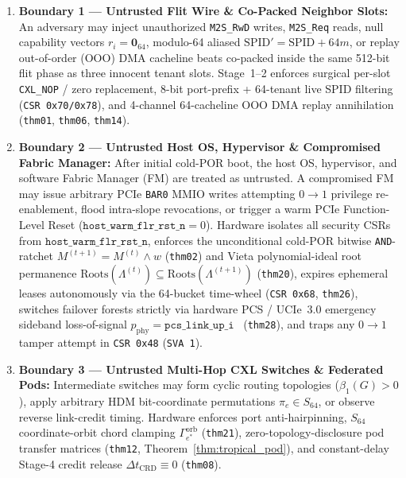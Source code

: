 \documentclass[10pt,twocolumn]{article}
\theoremstyle{spectralthm}
\begin{document}
\begin{enumerate}
  \item \textbf{Boundary 1 --- Untrusted Flit Wire \& Co-Packed Neighbor Slots:} An adversary may inject unauthorized \texttt{M2S\_RwD} writes, \texttt{M2S\_Req} reads, null capability vectors $r_i = \mathbf{0}_{64}$, modulo-64 aliased $\mathrm{SPID}' = \mathrm{SPID} + 64m$, or replay out-of-order (OOO) DMA cacheline beats co-packed inside the same 512-bit flit phase as three innocent tenant slots. Stage~1--2 enforces surgical per-slot \texttt{CXL\_NOP} / zero replacement, 8-bit port-prefix + 64-tenant live SPID filtering (\texttt{CSR 0x70/0x78}), and 4-channel 64-cacheline OOO DMA replay annihilation (\texttt{thm01}, \texttt{thm06}, \texttt{thm14}).
  \item \textbf{Boundary 2 --- Untrusted Host OS, Hypervisor \& Compromised Fabric Manager:} After initial cold-POR boot, the host OS, hypervisor, and software Fabric Manager (FM) are treated as untrusted. A compromised FM may issue arbitrary PCIe \texttt{BAR0} MMIO writes attempting $0 \rightarrow 1$ privilege re-enablement, flood intra-slope revocations, or trigger a warm PCIe Function-Level Reset ($\texttt{host\_warm\_flr\_rst\_n} = 0$). Hardware isolates all security CSRs from $\texttt{host\_warm\_flr\_rst\_n}$, enforces the unconditional cold-POR bitwise \texttt{AND}-ratchet $M^{(t+1)} = M^{(t)} \wedge w$ (\texttt{thm02}) and Vieta polynomial-ideal root permanence $\mathrm{Roots}(\Lambda^{(t)}) \subseteq \mathrm{Roots}(\Lambda^{(t+1)})$ (\texttt{thm20}), expires ephemeral leases autonomously via the 64-bucket time-wheel (\texttt{CSR 0x68}, \texttt{thm26}), switches failover forests strictly via hardware PCS / UCIe~3.0 emergency sideband loss-of-signal $p_{\mathrm{phy}} = \texttt{pcs\_link\_up\_i}$~\cite{ucie2025spec30} (\texttt{thm28}), and traps any $0 \rightarrow 1$ tamper attempt in \texttt{CSR 0x48} (\texttt{SVA 1}).
  \item \textbf{Boundary 3 --- Untrusted Multi-Hop CXL Switches \& Federated Pods:} Intermediate switches may form cyclic routing topologies ($\beta_1(G) > 0$), apply arbitrary HDM bit-coordinate permutations $\pi_e \in S_{64}$, or observe reverse link-credit timing. Hardware enforces port anti-hairpinning, $S_{64}$ coordinate-orbit chord clamping $\Gamma_{e^*}^{\mathrm{orb}}$ (\texttt{thm21}), zero-topology-disclosure pod transfer matrices (\texttt{thm12}, Theorem~\ref{thm:tropical_pod}), and constant-delay Stage-4 credit release $\Delta t_{\mathrm{CRD}} \equiv 0$ (\texttt{thm08}).

\end{enumerate}
\end{document}

